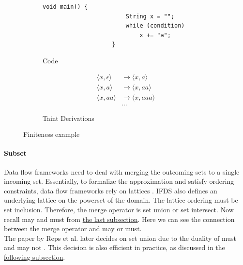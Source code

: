 \documentclass[../draft.tex]{subfiles}
\begin{document}
    \begin{figure}[ht]
        \centering
        \begin{subfigure}[b]{0.45\textwidth}
            \centering
            \begin{adjustbox}{max width=\columnwidth}
                \begin{lstlisting}[gobble=20]
                    void main() {
                        String x = "";
                        while (condition)
                            x += "a";
                    }
                \end{lstlisting}
            \end{adjustbox}
            \caption{Code}
        \end{subfigure}
        \qquad
        \begin{subfigure}[b]{0.45\textwidth}
            \centering
            $$
                \begin{aligned}
                    \langle x, \epsilon \rangle &\rightarrow \langle x, a \rangle\\
                    \langle x, a \rangle &\rightarrow \langle x, aa \rangle\\
                    \langle x, aa \rangle &\rightarrow \langle x, aaa \rangle\\
                    &\dots
                \end{aligned}
            $$
            \caption{Taint Derivations}
            \label{lst:ifdsfinite_b}
        \end{subfigure}
        \caption{Finiteness example}
        \label{lst:ifdsfinite}
    \end{figure}

    \paragraph{Subset} Data flow frameworks need to deal with merging the outcoming sets to a single incoming set.
    Essentially, to formalize the approximation and satisfy ordering constraints, data flow frameworks rely on lattices \cite{Khedker2009}.
    IFDS also defines an underlying lattice on the powerset of the domain.
    The lattice ordering must be set inclusion.
    Therefore, the merge operator is set union or set intersect.
    Now recall may and must from \hyperref[s:dataflow]{the last subsection}.
    Here we can see the connection between the merge operator and may or must.\\
    The paper by Reps et al. later decides on set union due to the duality of must and may not \cite{Reps1995}.
    This decision is also efficient in practice, as discussed in the \hyperref[s:ifdspractical]{following subsection}.
\end{document}
